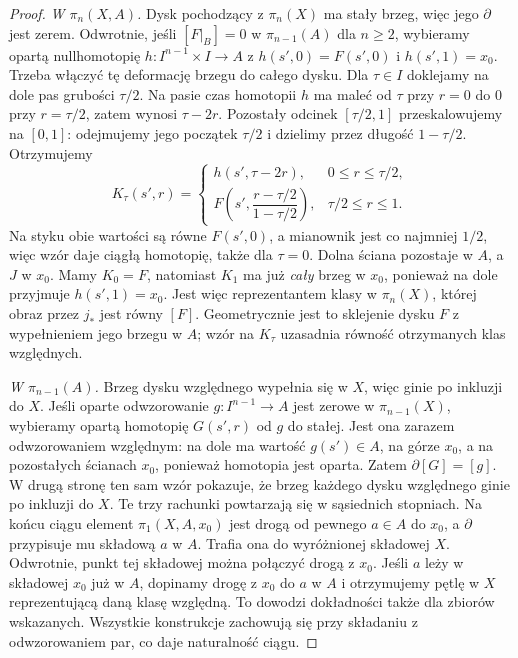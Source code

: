 \begin{proof}
\emph{W $\pi_n(X,A)$.} Dysk
pochodzący z $\pi_n(X)$
ma stały brzeg, więc jego
$\partial$ jest zerem.
Odwrotnie, jeśli $[F|_B]=0$ w $\pi_{n-1}(A)$ dla $n\geq2$,
wybieramy opartą nullhomotopię
$h:I^{n-1}\times I\to A$ z $h(s',0)=F(s',0)$ i $h(s',1)=x_0$.
Trzeba włączyć tę deformację brzegu do całego dysku.
Dla $\tau\in I$ doklejamy na dole pas grubości $\tau/2$.
Na pasie czas homotopii $h$ ma maleć od $\tau$ przy $r=0$
do $0$ przy $r=\tau/2$, zatem wynosi $\tau-2r$.
Pozostały odcinek $[\tau/2,1]$ przeskalowujemy na $[0,1]$:
odejmujemy jego początek $\tau/2$ i dzielimy przez długość $1-\tau/2$.
Otrzymujemy
\[
 K_\tau(s',r)=
 \begin{cases}
 h(s',\tau-2r),&0\leq r\leq\tau/2,\\
 F\left(s',\dfrac{r-\tau/2}{1-\tau/2}\right),&\tau/2\leq r\leq1.
 \end{cases}
\]
Na styku obie wartości są równe $F(s',0)$, a mianownik
jest co najmniej $1/2$, więc wzór daje ciągłą homotopię,
także dla $\tau=0$. Dolna ściana pozostaje w $A$,
a $J$ w $x_0$. Mamy $K_0=F$, natomiast $K_1$ ma już
\emph{cały} brzeg w $x_0$, ponieważ na dole przyjmuje $h(s',1)=x_0$.
Jest więc reprezentantem klasy w $\pi_n(X)$,
której obraz przez $j_*$ jest równy $[F]$.
Geometrycznie jest to sklejenie dysku $F$ z wypełnieniem jego brzegu w $A$;
wzór na $K_\tau$ uzasadnia równość otrzymanych klas względnych.

\emph{W $\pi_{n-1}(A)$.} Brzeg
dysku względnego wypełnia
się w $X$, więc ginie
po inkluzji do $X$.
Jeśli oparte odwzorowanie $g:I^{n-1}\to A$ jest
zerowe w $\pi_{n-1}(X)$, wybieramy opartą homotopię
$G(s',r)$ od $g$ do stałej. Jest ona zarazem odwzorowaniem względnym:
na dole ma wartość $g(s')\in A$, na górze $x_0$, a na pozostałych
ścianach $x_0$, ponieważ homotopia jest oparta.
Zatem $\partial[G]=[g]$. W drugą stronę ten sam wzór pokazuje,
że brzeg każdego dysku względnego ginie po inkluzji do $X$.
Te trzy rachunki powtarzają się w sąsiednich stopniach.
Na końcu ciągu element $\pi_1(X,A,x_0)$ jest drogą
od pewnego $a\in A$ do $x_0$, a $\partial$ przypisuje mu
składową $a$ w $A$. Trafia ona do wyróżnionej składowej $X$.
Odwrotnie, punkt tej składowej można połączyć drogą z $x_0$.
Jeśli $a$ leży w składowej $x_0$ już w $A$, dopinamy drogę
z $x_0$ do $a$ w $A$ i otrzymujemy pętlę w $X$ reprezentującą
daną klasę względną. To dowodzi dokładności także dla zbiorów wskazanych.
Wszystkie konstrukcje zachowują się przy składaniu z odwzorowaniem par,
co daje naturalność ciągu.
\end{proof}

